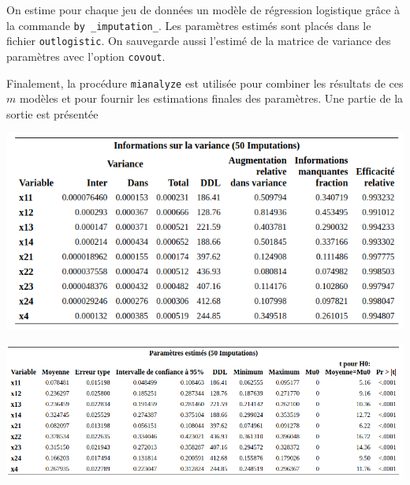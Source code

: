 \documentclass[
  11pt,
  letterpaper,
]{book}
\theoremstyle{definition}
\theoremstyle{definition}
\theoremstyle{definition}
\theoremstyle{remark}
\begin{document}
On estime pour chaque jeu de données un modèle de régression logistique grâce à la commande \texttt{by\ \_imputation\_}. Les paramètres estimés sont placés dans le fichier \texttt{outlogistic}. On sauvegarde aussi l'estimé de la matrice de variance des paramètres avec l'option \texttt{covout}.

Finalement, la procédure \texttt{mianalyze} est utilisée pour combiner les résultats de ces \(m\) modèles et pour fournir les estimations finales des paramètres. Une partie de la sortie est présentée

\begin{center}\includegraphics[width=0.8\linewidth]{figures/06-manquantes-e4} \end{center}

\begin{center}\includegraphics[width=1\linewidth]{figures/06-manquantes-e5} \end{center}
\end{document}
